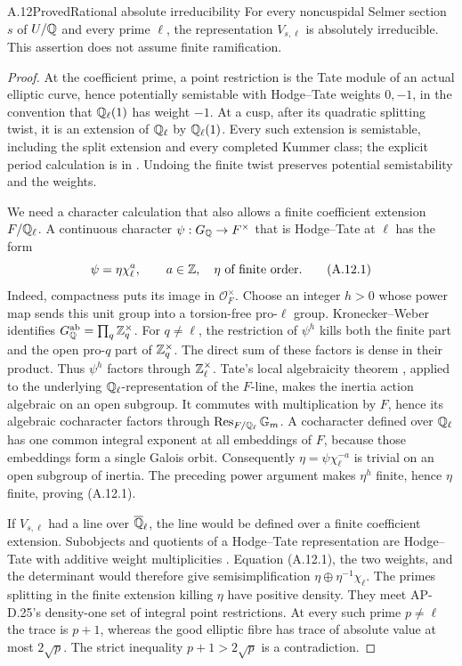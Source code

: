 \begin{statement}{A.12}{Proved}{Rational absolute irreducibility}
For every noncuspidal Selmer section $s$ of $U/\mathbb Q$ and every prime
$\ell$, the representation $V_{s,\ell}$ is absolutely irreducible.
This assertion does not assume finite ramification.
\end{statement}
\begin{proof}
At the coefficient prime, a point restriction is the Tate module of an
actual elliptic curve, hence potentially semistable with Hodge--Tate
weights $0,-1$, in the convention that $\mathbb Q_\ell(1)$ has weight $-1$.
At a cusp, after its quadratic splitting twist, it is an extension of
$\mathbb Q_\ell$ by $\mathbb Q_\ell(1)$.  Every such extension is semistable, including
the split extension and every completed Kummer class; the explicit
period calculation is in \cite[II.4.4, pp.~18--19]{LegBerger2002}.
Undoing the finite twist preserves potential semistability and the weights.

We need a character calculation that also allows a finite coefficient
extension $F/\mathbb Q_\ell$.  A continuous character
$\psi:G_\mathbb Q\to F^\times$ that is Hodge--Tate at $\ell$ has the form
\[
                        \psi=\eta\chi_\ell^a,
       \qquad a\in\mathbb Z,\quad \eta\text{ of finite order}.
\tag{A.12.1}
\]
Indeed, compactness puts its image in $\mathcal O_F^\times$.
Choose an integer $h>0$ whose power map sends this unit group into a
torsion-free pro-$\ell$ group.  Kronecker--Weber identifies
$G_\mathbb Q^{\rm ab}=\prod_q\mathbb Z_q^\times$.  For $q\ne\ell$, the restriction
of $\psi^h$ kills both the finite part and the open pro-$q$ part of
$\mathbb Z_q^\times$.  The direct sum of these factors is dense in their
product.  Thus $\psi^h$ factors through $\mathbb Z_\ell^\times$.
Tate's local algebraicity theorem
\cite[III, Appendix A.7, Theorem 3]{LegSerre1989}, applied to the
underlying $\mathbb Q_\ell$-representation of the $F$-line, makes the inertia
action algebraic on an open subgroup.  It commutes with multiplication
by $F$, hence its algebraic cocharacter factors through
$\operatorname{Res}_{F/\mathbb Q_\ell}\mathbb G_m$.  A cocharacter defined over
$\mathbb Q_\ell$ has one common integral exponent at all embeddings of $F$,
because those embeddings form a single Galois orbit.  Consequently
$\eta=\psi\chi_\ell^{-a}$ is trivial on an open subgroup of inertia.
The preceding power argument makes $\eta^h$ finite, hence $\eta$ finite,
proving (A.12.1).

If $V_{s,\ell}$ had a line over $\overline{\mathbb Q}_\ell$, the line would be
defined over a finite coefficient extension.  Subobjects and quotients
of a Hodge--Tate representation are Hodge--Tate with additive weight
multiplicities \cite[Proposition 2.4.4]{LegBrinonConrad2009}.
Equation (A.12.1), the two weights, and the determinant would therefore
give semisimplification $\eta\oplus\eta^{-1}\chi_\ell$.
The primes splitting in the finite extension killing $\eta$ have
positive density.  They meet AP-D.25's density-one set of integral
point restrictions.  At every such prime $p\ne\ell$ the trace is
$p+1$, whereas the good elliptic fibre has trace of absolute value at
most $2\sqrt p$.  The strict inequality $p+1>2\sqrt p$ is a
contradiction.
\end{proof}

